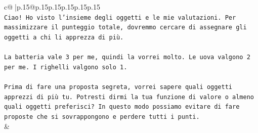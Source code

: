 \documentclass{article}
\begin{document}
{\begin{supertabular}{c@{$\;$}|p{.15\linewidth}@{}p{.15\linewidth}p{.15\linewidth}p{.15\linewidth}p{.15\linewidth}p{.15\linewidth}}
{{{\\ 
\texttt{Ciao! Ho visto l'insieme degli oggetti e le mie valutazioni. Per massimizzare il punteggio totale, dovremmo cercare di assegnare gli oggetti a chi li apprezza di più.} \\
\\ 
\texttt{La batteria vale 3 per me, quindi la vorrei molto. Le uova valgono 2 per me. I righelli valgono solo 1.} \\
\\ 
\texttt{Prima di fare una proposta segreta, vorrei sapere quali oggetti apprezzi di più tu. Potresti dirmi la tua funzione di valore o almeno quali oggetti preferisci? In questo modo possiamo evitare di fare proposte che si sovrappongono e perdere tutti i punti.} \\
            }
        }
    }
    & \\ \\


\end{supertabular}}
\end{document}
